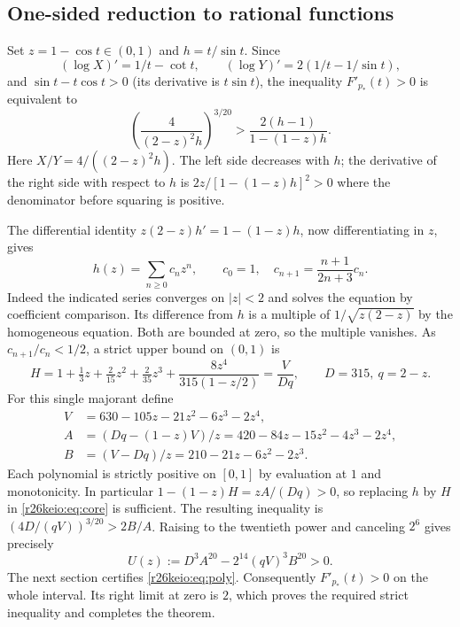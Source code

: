 \documentclass[11pt,a4paper]{article}
\numberwithin{equation}{section}
\theoremstyle{definition}
\theoremstyle{remark}
\begin{document}
\subsection{One-sided reduction to rational functions}
Set $z=1-\cos t\in(0,1)$ and $h=t/\sin t$. Since
\[
 (\log X)'=1/t-\cot t,\qquad (\log Y)'=2(1/t-1/\sin t),
\]
and $\sin t-t\cos t>0$ (its derivative is $t\sin t$), the inequality $F'_{p_*}(t)>0$ is equivalent to
\begin{equation}
 \left(\frac{4}{(2-z)^2h}\right)^{3/20}>
 \frac{2(h-1)}{1-(1-z)h}.\label{r26keio:eq:core}
\end{equation}
Here $X/Y=4/((2-z)^2h)$. The left side decreases with $h$; the derivative of the right side with respect to $h$ is $2z/[1-(1-z)h]^2>0$ where the denominator before squaring is positive.

The differential identity $z(2-z)h'=1-(1-z)h$, now differentiating in $z$, gives
\[
 h(z)=\sum_{n\ge0}c_n z^n,\qquad c_0=1,\quad
 c_{n+1}=\frac{n+1}{2n+3}c_n.
\]
Indeed the indicated series converges on $|z|<2$ and solves the equation by coefficient comparison. Its difference from $h$ is a multiple of $1/\sqrt{z(2-z)}$ by the homogeneous equation. Both are bounded at zero, so the multiple vanishes. As $c_{n+1}/c_n<1/2$, a strict upper bound on $(0,1)$ is
\[
 H=1+\tfrac13 z+\tfrac2{15}z^2+\tfrac2{35}z^3+
       \frac{8z^4}{315(1-z/2)}=\frac{V}{Dq},\qquad D=315,\ q=2-z.
\]
For this single majorant define
\begin{align*}
 V&=630-105z-21z^2-6z^3-2z^4,\\
 A&=(Dq-(1-z)V)/z=420-84z-15z^2-4z^3-2z^4,\\
 B&=(V-Dq)/z=210-21z-6z^2-2z^3.
\end{align*}
Each polynomial is strictly positive on $[0,1]$ by evaluation at $1$ and monotonicity. In particular $1-(1-z)H=zA/(Dq)>0$, so replacing $h$ by $H$ in \eqref{r26keio:eq:core} is sufficient. The resulting inequality is $(4D/(qV))^{3/20}>2B/A$. Raising to the twentieth power and canceling $2^6$ gives precisely
\begin{equation}
 U(z):=D^3A^{20}-2^{14}(qV)^3B^{20}>0.\label{r26keio:eq:poly}
\end{equation}
The next section certifies \eqref{r26keio:eq:poly}. Consequently $F'_{p_*}(t)>0$ on the whole interval. Its right limit at zero is $2$, which proves the required strict inequality and completes the theorem.
\end{document}
